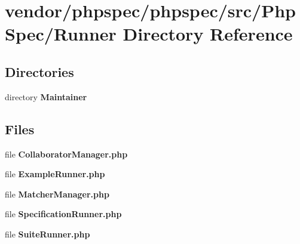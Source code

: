 \section{vendor/phpspec/phpspec/src/\+Php\+Spec/\+Runner Directory Reference}
\label{dir_dbcf22f7015b083c3366da5552e7ed48}
\subsection*{Directories}
\begin{DoxyCompactItemize}
\item 
directory {\bf Maintainer}
\end{DoxyCompactItemize}
\subsection*{Files}
\begin{DoxyCompactItemize}
\item 
file {\bf Collaborator\+Manager.\+php}
\item 
file {\bf Example\+Runner.\+php}
\item 
file {\bf Matcher\+Manager.\+php}
\item 
file {\bf Specification\+Runner.\+php}
\item 
file {\bf Suite\+Runner.\+php}
\end{DoxyCompactItemize}

